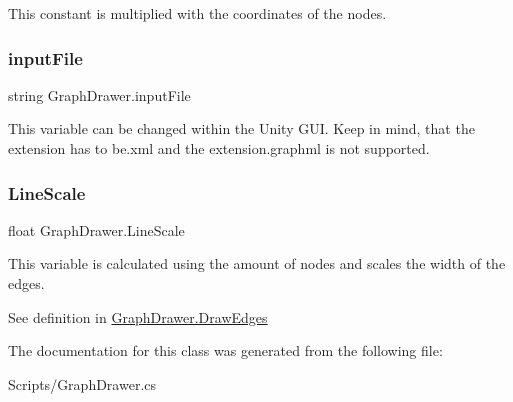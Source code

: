 This constant is multiplied with the coordinates of the nodes. 

\mbox{\label{class_graph_drawer_a1264583a4ab9461d51c53c78ca12c5fa}} 
\subsubsection{\texorpdfstring{inputFile}{inputFile}}
{\footnotesize\ttfamily string Graph\+Drawer.\+input\+File}



This variable can be changed within the Unity G\+UI. Keep in mind, that the extension has to be.\+xml and the extension.\+graphml is not supported. 

\mbox{\label{class_graph_drawer_aa5ef4a330d302c0d55a33376a4727edf}} 
\subsubsection{\texorpdfstring{LineScale}{LineScale}}
{\footnotesize\ttfamily float Graph\+Drawer.\+Line\+Scale}



This variable is calculated using the amount of nodes and scales the width of the edges. 

See definition in \mbox{\hyperlink{class_graph_drawer_ad4bde4b9d817629c77bc1e8818e5cd69}{Graph\+Drawer.\+Draw\+Edges}} 

The documentation for this class was generated from the following file\+:\begin{DoxyCompactItemize}
\item 
Scripts/Graph\+Drawer.\+cs\end{DoxyCompactItemize}
